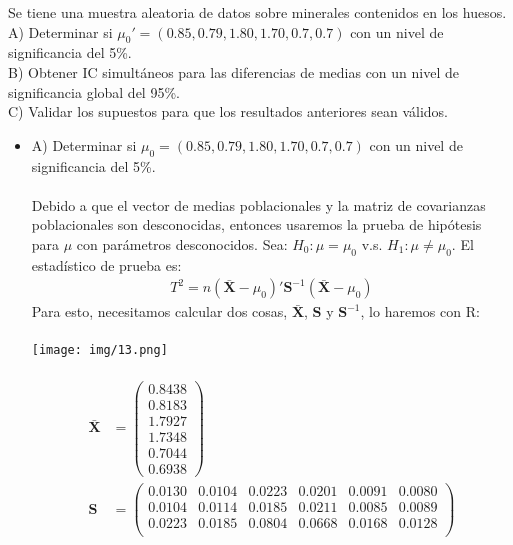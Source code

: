 \begin{problem}{3}
Se tiene una muestra aleatoria de datos sobre minerales contenidos en los huesos. \\
A) Determinar si $\mu_0'=(0.85,0.79,1.80,1.70,0.7,0.7)$ con un nivel de significancia del 5\%.\\
B) Obtener IC simultáneos para las diferencias de medias con un nivel de significancia global del 95\%.\\
C) Validar los supuestos para que los resultados anteriores sean válidos. 
\end{problem}

\begin{sol}
\begin{itemize}
\item A) Determinar si $\mu_0=(0.85,0.79,1.80,1.70,0.7,0.7)$ con un nivel de significancia del 5\%.\\\\
Debido a que el vector de medias poblacionales y la matriz de covarianzas poblacionales son desconocidas, entonces usaremos la prueba de hipótesis para $\mu$ con parámetros desconocidos. Sea:
$H_0:\mu = \mu_0 $ v.s. $H_1:\mu \neq \mu_0$.
El estadístico de prueba es:
\begin{align*}
T^2=n(\bar{\mathbf{X}} - \mu_0)'\mathbf{S}^{-1}(\mathbf{\bar{X}}-\mu_0)
\end{align*}
Para esto, necesitamos calcular dos cosas, $\mathbf{\bar{X}}$, $\mathbf{S}$ y $\mathbf{S}^{-1}$, lo haremos con R:\\\\
\texttt{[image: img/13.png]}\\\\
\begin{align*}
    \mathbf{\bar{X}}&= \begin{pmatrix} 0.8438 \\ 0.8183 \\ 1.7927 \\ 1.7348 \\ 0.7044 \\ 0.6938 \end{pmatrix} \\
    \mathbf{S} &= \begin{pmatrix}
        0.0130 & 0.0104 & 0.0223 & 0.0201 & 0.0091 & 0.0080 \\
        0.0104 & 0.0114 & 0.0185 & 0.0211 & 0.0085 & 0.0089 \\
        0.0223 & 0.0185 & 0.0804 & 0.0668 & 0.0168 & 0.0128 \\

\end{pmatrix}
\end{align*}
\end{itemize}
\end{sol}

